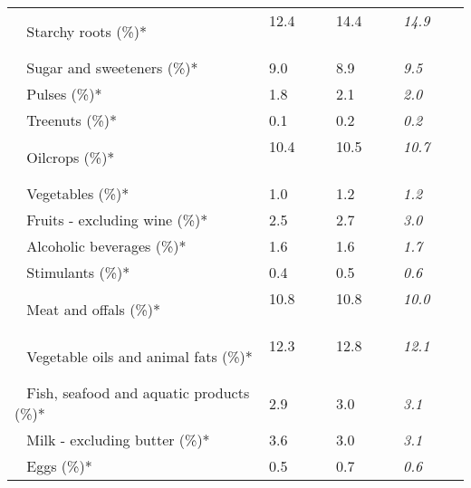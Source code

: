 \begin{tabular}{L{3.9cm} R{1cm} R{1cm} R{1cm}}
	 ~ Starchy roots (\%)* & 12.4 ~ \ \ & 14.4 ~ \ \ & \textit{14.9} ~ \ \ \\ 
	 ~ Sugar and sweeteners (\%)* & 9.0 ~ \ \ & 8.9 ~ \ \ & \textit{9.5} ~ \ \ \\ 
	 ~ Pulses (\%)* & 1.8 ~ \ \ & 2.1 ~ \ \ & \textit{2.0} ~ \ \ \\ 
	 ~ Treenuts (\%)* & 0.1 ~ \ \ & 0.2 ~ \ \ & \textit{0.2} ~ \ \ \\ 
	 ~ Oilcrops (\%)* & 10.4 ~ \ \ & 10.5 ~ \ \ & \textit{10.7} ~ \ \ \\ 
	 ~ Vegetables (\%)* & 1.0 ~ \ \ & 1.2 ~ \ \ & \textit{1.2} ~ \ \ \\ 
	 ~ Fruits - excluding wine (\%)* & 2.5 ~ \ \ & 2.7 ~ \ \ & \textit{3.0} ~ \ \ \\ 
	 ~ Alcoholic beverages (\%)* & 1.6 ~ \ \ & 1.6 ~ \ \ & \textit{1.7} ~ \ \ \\ 
	 ~ Stimulants (\%)* & 0.4 ~ \ \ & 0.5 ~ \ \ & \textit{0.6} ~ \ \ \\ 
	 ~ Meat and offals (\%)* & 10.8 ~ \ \ & 10.8 ~ \ \ & \textit{10.0} ~ \ \ \\ 
	 ~ Vegetable oils and animal fats (\%)* & 12.3 ~ \ \ & 12.8 ~ \ \ & \textit{12.1} ~ \ \ \\ 
	 ~ Fish, seafood and aquatic products (\%)* & 2.9 ~ \ \ & 3.0 ~ \ \ & \textit{3.1} ~ \ \ \\ 
	 ~ Milk - excluding butter (\%)* & 3.6 ~ \ \ & 3.0 ~ \ \ & \textit{3.1} ~ \ \ \\ 
	 ~ Eggs (\%)* & 0.5 ~ \ \ & 0.7 ~ \ \ & \textit{0.6} ~ \ \ \\ 
       \toprule
      \end{tabular}
      \clearpage
{}
